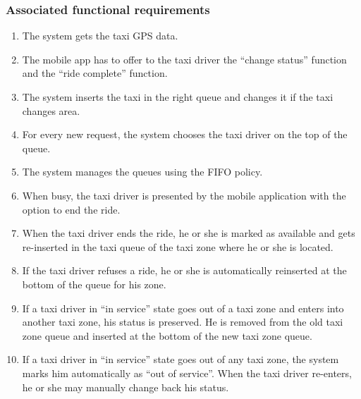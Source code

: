 \subsubsection{Associated functional requirements}
\begin{enumerate}
\item The system gets the taxi GPS data.
\item The mobile app has to offer to the taxi driver the ``change status'' function and the ``ride complete'' function.
\item The system inserts the taxi in the right queue and changes it if the taxi changes area.
\item For every new request, the system chooses the taxi driver on the top of the queue.
\item The system manages the queues using the FIFO policy.
\item When busy, the taxi driver is presented by the mobile application with the option to end the ride.
\item When the taxi driver ends the ride, he or she is marked as available and gets re-inserted in the taxi queue of the taxi zone where he or she is located.
\item If the taxi driver refuses a ride, he or she is automatically reinserted at the bottom of the queue for his zone.
\item If a taxi driver in ``in service'' state goes out of a taxi zone and enters into another taxi zone, his status is preserved. He is removed from the old taxi zone queue and inserted at the bottom of the new taxi zone queue.
\item If a taxi driver in ``in service'' state goes out of any taxi zone, the system marks him automatically as ``out of service''. When the taxi driver re-enters, he or she may manually change back his status.
\end{enumerate}
